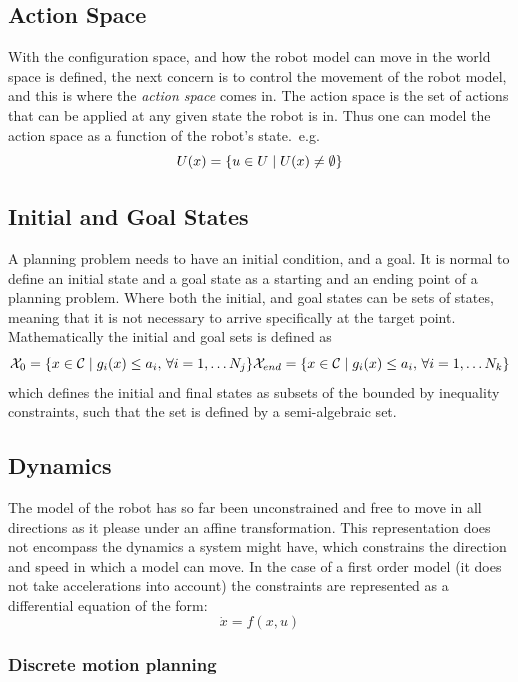 \subsection{Action Space}

With the configuration space, and how the robot model can move in the world
space is defined, the next concern is to control the movement of the robot
model, and this is where the \textit{action space} comes in. The action space is
the set of actions that can be applied at any given state the robot is in. Thus
one can model the action space as a function of the robot's state.\ e.g.
\[
  U(x) = \lbrace u \in U \mid U(x)
    \neq \emptyset \rbrace
\]

\subsection{Initial and Goal States}

A planning problem needs to have an initial condition, and a goal. It is normal
to define an initial state and a goal state as a starting and an ending point of
a planning problem. Where both the initial, and goal states can be sets of
states, meaning that it is not necessary to arrive specifically at the target
point. Mathematically the initial and goal sets is defined as
\[
  \mathcal{X}_0 = \lbrace x \in \mathcal{C}{} \mid g_i(x) \leq a_i,
    \, \forall i = 1,\ldots N_j\rbrace \\
  \mathcal{X}_{end} = \lbrace x \in \mathcal{C}{} \mid g_i(x) \leq
    a_i, \, \forall i = 1,\ldots N_k\rbrace
\]
which defines the initial and final states as subsets of the
\modelconfigurationspace{} bounded by inequality constraints, such that the set
is defined by a semi-algebraic set.

\subsection{Dynamics}

The model of the robot has so far been unconstrained and free to move in all
directions as it please under an affine transformation. This representation does
not encompass the dynamics a system might have, which constrains the direction
and speed in which a model can move. In the case of a first order model (\ie it
does not take accelerations into account) the constraints are represented as a
differential equation of the form:
\[
  \dot{x} = f(x,u)
\]

\subsubsection{Discrete motion planning}

